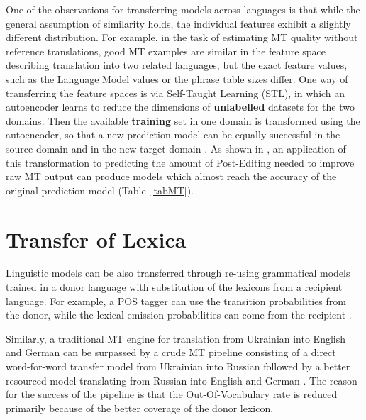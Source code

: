 \documentclass[11pt]{article}
\begin{document}
One of the observations for transferring models across languages is that while the general assumption of similarity holds, the individual features exhibit a slightly different distribution.  For example, in the task of estimating MT quality without reference translations, good MT examples are similar in the feature space describing translation into two related languages, but the exact feature values, such as the Language Model values or the phrase table sizes differ.  One way of transferring the feature spaces is via Self-Taught Learning (STL), in which an autoencoder learns to reduce the dimensions of \textbf{unlabelled} datasets for the two domains.  Then the available \textbf{training} set in one domain is transformed using the autoencoder, so that a new prediction model can be equally successful in the source domain and in the new target domain \cite{raina07}.  As shown in \cite{rios16}, an application of this transformation to predicting the amount of Post-Editing needed to improve raw MT output can produce models which almost reach the accuracy of the original prediction model (Table~\ref{tabMT}).

\section{Transfer of Lexica}
Linguistic models can be also transferred through re-using grammatical models trained in a donor language with substitution of the lexicons from a recipient language.  For example, a POS tagger can use the transition probabilities from the donor, while the lexical emission probabilities can come from the recipient \cite{feldman06,reddy11kannada}.

Similarly, a traditional MT engine for translation from Ukrainian into English and German can be surpassed by a crude MT pipeline consisting of a direct word-for-word transfer model from Ukrainian into Russian followed by a better resourced model translating from Russian into English and German \cite{babych07-mtsummit}.  The reason for the success of the pipeline is that the Out-Of-Vocabulary rate is reduced primarily because of the better coverage of the donor lexicon.
\end{document}
